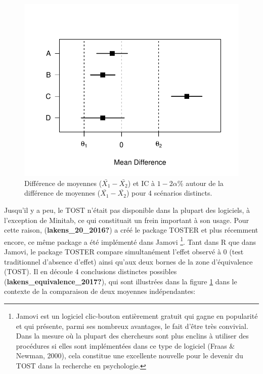 \documentclass[
  english,
  man]{apa6}
\begin{document}
\begin{figure}

{\centering \includegraphics{chp5_files/figure-latex/equiv1-1} 

}

\caption{Différence de moyennes ($\bar{X_1}-\bar{X_2}$) et IC à $1-2\alpha\%$ autour de la différence de moyennes ($\bar{X_1}-\bar{X_2}$) pour 4 scénarios distincts.}\label{fig:equiv1}
\end{figure}

Jusqu'il y a peu, le TOST n'était pas disponible dans la plupart des logiciels, à l'exception de Minitab, ce qui constituait un frein important à son usage. Pour cette raison, (\textbf{lakens\_20\_2016?}) a créé le package TOSTER et plus récemment encore, ce même package a été implémenté dans Jamovi \footnote{Jamovi est un logiciel clic-bouton entièrement gratuit qui gagne en popularité et qui présente, parmi ses nombreux avantages, le fait d'être très convivial. Dans la mesure où la plupart des chercheurs sont plus enclins à utiliser des procédures si elles sont implémentées dans ce type de logiciel (Fraas $\&$ Newman, 2000), cela constitue une excellente nouvelle pour le devenir du TOST dans la recherche en psychologie.}. Tant dans R que dans Jamovi, le package TOSTER compare simultanément l'effet observé à 0 (test traditionnel d'absence d'effet) ainsi qu'aux deux bornes de la zone d'équivalence (TOST). Il en découle 4 conclusions distinctes possibles (\textbf{lakens\_equivalence\_2017?}), qui sont illustrées dans la figure \ref{fig:equiv1} dans le contexte de la comparaison de deux moyennes indépendantes:
\end{document}
